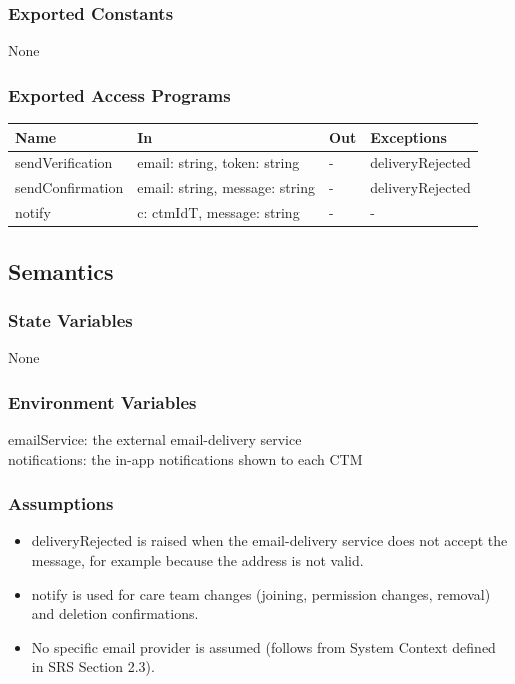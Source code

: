 \documentclass[12pt, titlepage]{article}
\begin{document}
\subsubsection{Exported Constants}

None

\subsubsection{Exported Access Programs}

\begin{center}
\small
\begin{tabular}{p{3.3cm} p{4.7cm} p{2.6cm} p{2.8cm}}
\hline
\textbf{Name} & \textbf{In} & \textbf{Out} & \textbf{Exceptions} \\
\hline
sendVerification & email: string, token: string & - & deliveryRejected \\
sendConfirmation & email: string, message: string & - & deliveryRejected \\
notify & c: ctmIdT, message: string & - & - \\
\hline
\end{tabular}
\end{center}

\subsection{Semantics}

\subsubsection{State Variables}

None

\subsubsection{Environment Variables}

emailService: the external email-delivery service \\
notifications: the in-app notifications shown to each CTM

\subsubsection{Assumptions}

\begin{itemize}
\item deliveryRejected is raised when the email-delivery service does not accept
  the message, for example because the address is not valid.
\item notify is used for care team changes (joining, permission changes,
  removal) and deletion confirmations.
\item No specific email provider is assumed (follows from System Context defined in SRS Section 2.3).
\end{itemize}
\end{document}
